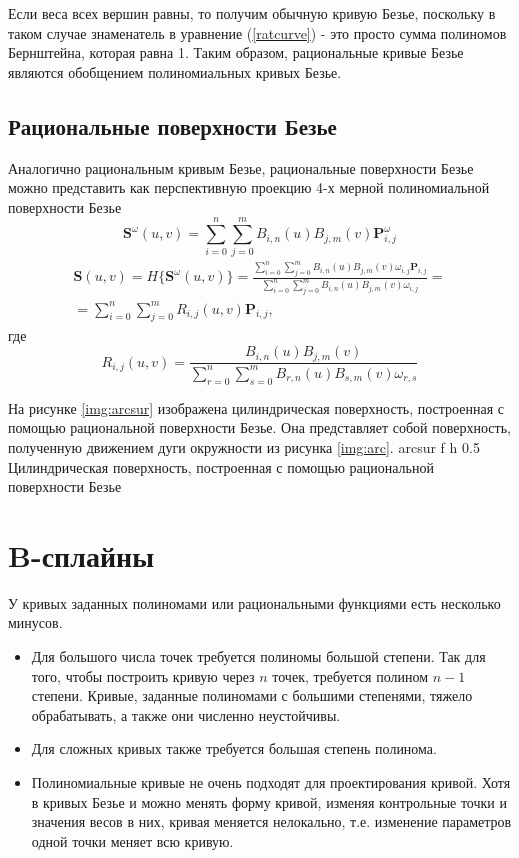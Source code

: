 \documentclass{bmstu}
\begin{document}
Если веса всех вершин равны, то получим обычную кривую Безье, поскольку в таком случае знаменатель в уравнение (\ref{ratcurve}) - это просто сумма полиномов Бернштейна, которая равна 1. Таким образом, рациональные кривые Безье являются обобщением полиномиальных кривых Безье.
\subsection{Рациональные поверхности Безье}

Аналогично рациональным кривым Безье, рациональные поверхности Безье можно представить как перспективную проекцию 4-х мерной полиномиальной поверхности Безье
\[
    \mathbf{S}^\omega(u, v) = \sum\limits_{i=0}^n\sum\limits_{j=0}^mB_{i,n}(u)B_{j,m}(v)\mathbf{P}^\omega_{i,j}
\]
\begin{multline}
    \mathbf{S}(u,v) = H\{\mathbf{S}^\omega(u, v)\} =  \frac{\sum\limits_{i=0}^n\sum\limits_{j=0}^mB_{i,n}(u)B_{j,m}(v)\omega_{i, j}\mathbf{P}_{i,j}}{\sum\limits_{i=0}^n\sum\limits_{j=0}^mB_{i,n}(u)B_{j,m}(v)\omega_{i, j}} =\\= \sum\limits_{i=0}^n\sum\limits_{j=0}^mR_{i,j}(u,v)\mathbf{P}_{i,j},
\end{multline}
где
\begin{equation}
    R_{i,j}(u, v) = \frac{B_{i, n}(u)B_{j, m}(v)}{\sum\limits_{r=0}^n\sum\limits_{s=0}^mB_{r,n}(u)B_{s,m}(v)\omega_{r, s}}
\end{equation}

На рисунке \ref{img:arcsur} изображена цилиндрическая поверхность, построенная с помощью рациональной поверхности Безье. Она представляет собой поверхность, полученную движением дуги окружности из рисунка \ref{img:arc}.
{arcsur} %
{f} %
{h} %
{0.5\textwidth} %
{Цилиндрическая поверхность, построенная с помощью рациональной поверхности Безье} %

\section{B-сплайны}

У кривых заданных полиномами или рациональными функциями есть несколько минусов.
\begin{itemize}
    \item Для большого числа точек требуется полиномы большой степени. Так для того, чтобы построить кривую через $n$ точек, требуется полином $n-1$ степени. Кривые, заданные полиномами с большими степенями, тяжело обрабатывать, а также они численно неустойчивы.
    \item Для сложных кривых также требуется большая степень полинома.
    \item Полиномиальные кривые не очень подходят для проектирования кривой. Хотя в кривых Безье и можно менять форму кривой, изменяя контрольные точки и  значения весов в них, кривая меняется нелокально, т.е. изменение параметров одной точки меняет всю кривую.
\end{itemize}
\end{document}
